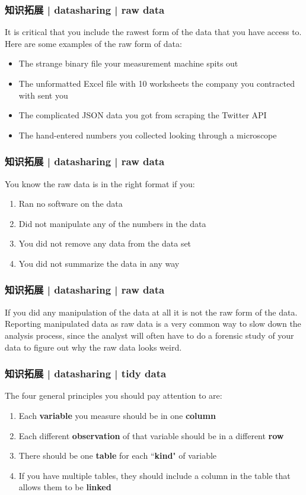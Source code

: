 \begin{frame}
  \frametitle{知识拓展 | datasharing | raw data}
  It is critical that you include the rawest form of the data that you have access to. Here are some examples of the raw form of data:
  \begin{itemize}
    \item The strange binary file your measurement machine spits out
    \item The unformatted Excel file with 10 worksheets the company you contracted with sent you
    \item The complicated JSON data you got from scraping the Twitter API
    \item The hand-entered numbers you collected looking through a microscope
  \end{itemize}
\end{frame}

\begin{frame}
  \frametitle{知识拓展 | datasharing | raw data}
  You know the raw data is in the right format if you:
  \begin{enumerate}
    \item Ran no software on the data
    \item Did not manipulate any of the numbers in the data
    \item You did not remove any data from the data set
    \item You did not summarize the data in any way
  \end{enumerate}
\end{frame}

\begin{frame}
  \frametitle{知识拓展 | datasharing | raw data}
  If you did any manipulation of the data at all it is not the raw form of the data. Reporting manipulated data as raw data is a very common way to slow down the analysis process, since the analyst will often have to do a forensic study of your data to figure out why the raw data looks weird.
\end{frame}

\begin{frame}
  \frametitle{知识拓展 | datasharing | tidy data}
  The four general principles you should pay attention to are:
  \begin{enumerate}
    \item Each \textbf{variable} you measure should be in one \textbf{column}
    \item Each different \textbf{observation} of that variable should be in a different \textbf{row}
    \item There should be one \textbf{table} for each ``\textbf{kind}" of variable
    \item If you have multiple tables, they should include a column in the table that allows them to be \textbf{linked}
  \end{enumerate}
\end{frame}

